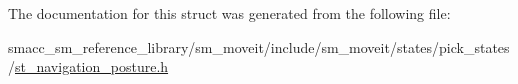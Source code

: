 The documentation for this struct was generated from the following file\+:\begin{DoxyCompactItemize}
\item 
smacc\+\_\+sm\+\_\+reference\+\_\+library/sm\+\_\+moveit/include/sm\+\_\+moveit/states/pick\+\_\+states/\hyperlink{include_2sm__moveit_2states_2pick__states_2st__navigation__posture_8h}{st\+\_\+navigation\+\_\+posture.\+h}\end{DoxyCompactItemize}
